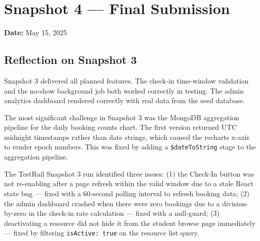 \documentclass[12pt]{article}
\begin{document}
\section{Snapshot 4 --- Final Submission}
\textbf{Date:} May 15, 2025

\subsection{Reflection on Snapshot 3}
Snapshot 3 delivered all planned features. The check-in time-window validation and the no-show background job both worked correctly in testing. The admin analytics dashboard rendered correctly with real data from the seed database.

The most significant challenge in Snapshot 3 was the MongoDB aggregation pipeline for the daily booking counts chart. The first version returned UTC midnight timestamps rather than date strings, which caused the recharts x-axis to render epoch numbers. This was fixed by adding a \texttt{\$dateToString} stage to the aggregation pipeline.

The TestRail Snapshot 3 run identified three issues: (1) the Check-In button was not re-enabling after a page refresh within the valid window due to a stale React state bug --- fixed with a 60-second polling interval to refresh booking data; (2) the admin dashboard crashed when there were zero bookings due to a division-by-zero in the check-in rate calculation --- fixed with a null-guard; (3) deactivating a resource did not hide it from the student browse page immediately --- fixed by filtering \texttt{isActive: true} on the resource list query.
\end{document}
